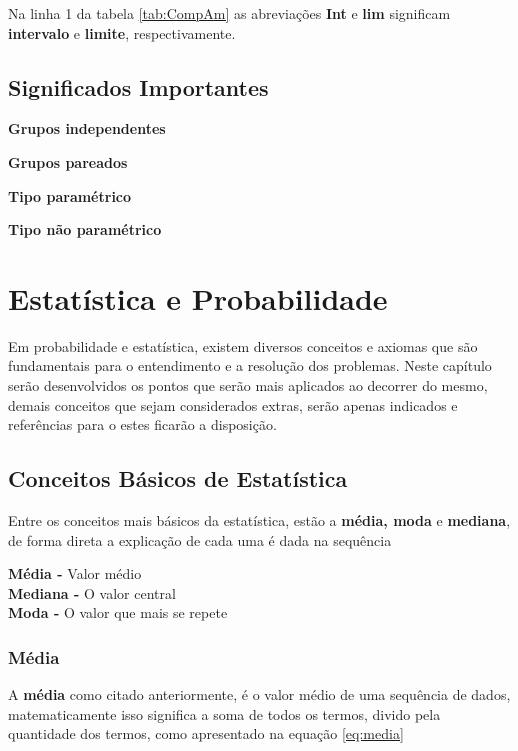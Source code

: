 \documentclass[
]{book}
\begin{document}
Na linha 1 da tabela \ref{tab:CompAm} as abreviações \textbf{Int} e \textbf{lim} significam \textbf{intervalo} e \textbf{limite}, respectivamente.

\hypertarget{significados-importantes}{%
\section{Significados Importantes}\label{significados-importantes}}

\textbf{Grupos independentes}

\textbf{Grupos pareados}

\textbf{Tipo paramétrico}

\textbf{Tipo não paramétrico}

\hypertarget{estatuxedstica-e-probabilidade}{%
\chapter{Estatística e Probabilidade}\label{estatuxedstica-e-probabilidade}}

Em probabilidade e estatística, existem diversos conceitos e axiomas que são fundamentais para o entendimento e a resolução dos problemas. Neste capítulo serão desenvolvidos os pontos que serão mais aplicados ao decorrer do mesmo, demais conceitos que sejam considerados extras, serão apenas indicados e referências para o estes ficarão a disposição.

\hypertarget{conceitos-buxe1sicos-de-estatuxedstica}{%
\section{Conceitos Básicos de Estatística}\label{conceitos-buxe1sicos-de-estatuxedstica}}

Entre os conceitos mais básicos da estatística, estão a \textbf{média, moda} e \textbf{mediana}, de forma direta a explicação de cada uma é dada na sequência

\textbf{Média -} Valor médio\\
\textbf{Mediana -} O valor central\\
\textbf{Moda -} O valor que mais se repete

\hypertarget{muxe9dia}{%
\subsection{Média}\label{muxe9dia}}

A \textbf{média} como citado anteriormente, é o valor médio de uma sequência de dados, matematicamente isso significa a soma de todos os termos, divido pela quantidade dos termos, como apresentado na equação \eqref{eq:media}
\end{document}
